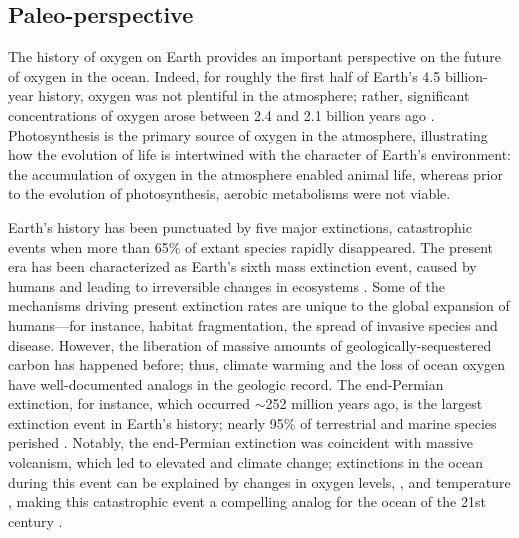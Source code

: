 \documentclass[draft,linenumbers]{report_chapter}
\begin{document}
\subsection{Paleo-perspective}

The history of oxygen on Earth provides an important perspective on the future of oxygen in the ocean.
Indeed, for roughly the first half of Earth's 4.5 billion-year history, oxygen was not plentiful in the atmosphere; rather, significant concentrations of oxygen arose between 2.4 and 2.1 billion years ago \citep{Lyons-Reinhard-etal-2014}.
Photosynthesis is the primary source of oxygen in the atmosphere, illustrating how the evolution of life is intertwined with the character of Earth's environment: the accumulation of oxygen in the atmosphere enabled animal life, whereas prior to the evolution of photosynthesis, aerobic metabolisms were not viable.

Earth's history has been punctuated by five major extinctions, catastrophic events when more than 65\% of extant species rapidly disappeared.
The present era has been characterized as Earth's sixth mass extinction event, caused by humans and leading to irreversible changes in ecosystems \citep{Barnosky-Matzke-etal-2011}.
Some of the mechanisms driving present extinction rates are unique to the global expansion of humans---for instance, habitat fragmentation, the spread of invasive species and disease.
However, the liberation of massive amounts of geologically-sequestered carbon has happened before; thus, climate warming and the loss of ocean oxygen have well-documented analogs in the geologic record.
The end-Permian extinction, for instance, which occurred $\sim$252 million years ago, is the largest extinction event in Earth's history; nearly 95\% of terrestrial and marine species perished \citep{Raup-1979,Erwin-1993}.
Notably, the end-Permian extinction was coincident with massive volcanism, which led to elevated  and climate change; extinctions in the ocean during this event can be explained by changes in oxygen levels, , and temperature \citep{Song-Wignall-etal-2014}, making this catastrophic event a compelling analog for the ocean of the 21st century \citep{Payne-Clapham-2012}.
\end{document}
